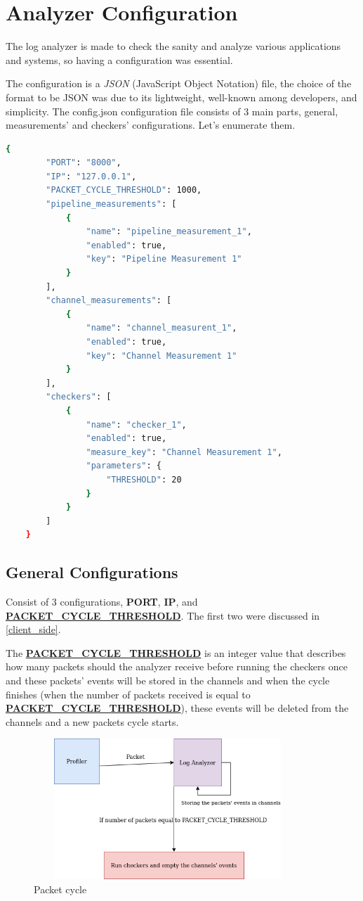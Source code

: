 \section{Analyzer Configuration}
The log analyzer is made to check the sanity and analyze various
applications and systems, so having a configuration was essential.

The configuration is a \textit{JSON} (JavaScript Object Notation) file,
the choice of the format to be JSON was due to its
lightweight, well-known among developers, and simplicity. 
The config.json configuration file consists of 3 main parts, 
general, measurements' and checkers' configurations. Let's enumerate them.
\newline
\begin{lstlisting}[language=bash, caption={Sample configuration},captionpos=b, label={lst:sample_confing}]
	{
		"PORT": "8000",
		"IP": "127.0.0.1",
		"PACKET_CYCLE_THRESHOLD": 1000,
		"pipeline_measurements": [
			{
				"name": "pipeline_measurement_1",
				"enabled": true,
				"key": "Pipeline Measurement 1"
			}
		],
		"channel_measurements": [
			{
				"name": "channel_measurent_1",
				"enabled": true,
				"key": "Channel Measurement 1"
			}
		],
		"checkers": [
			{
				"name": "checker_1",
				"enabled": true,
				"measure_key": "Channel Measurement 1",
				"parameters": {
					"THRESHOLD": 20
				}
			}
		]
	}
\end{lstlisting}

\subsection{General Configurations} \label{sec:g_config}
Consist of 3 configurations, \textbf{PORT}, \textbf{IP}, 
and \textbf{\url{PACKET_CYCLE_THRESHOLD}}. The first two were discussed in \ref{client_side}.

The \textbf{\url{PACKET_CYCLE_THRESHOLD}} is an integer value that describes
how many packets should the analyzer receive before running the checkers once
and these packets' events will be stored in the channels and when the cycle
finishes (when the number of packets received is equal to \textbf{\url{PACKET_CYCLE_THRESHOLD}}), these
events will be deleted from the channels and a new packets cycle starts.
\newline
\begin{figure}[H]
	\centering
	\includegraphics[width=0.9\textwidth,height=200px]{images/packets_cycle.png}
	\caption{Packet cycle}
	\label{fig:packets_cycle}
\end{figure}

